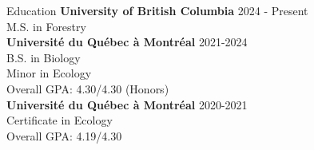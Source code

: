 \documentclass[
	11pt, %
]{resume} %
\begin{document}

\begin{rSection}{Education}
	\textbf{University of British Columbia} \hfill 2024 - Present\\
	M.S. in Forestry
	\smallskip \\
	\textbf{Université du Québec à Montréal} \hfill 2021-2024 \\ 
	B.S. in Biology\\ 
	Minor in Ecology \\ 
	Overall GPA: 4.30/4.30 (Honors)
	\smallskip \\
	\textbf{Université du Québec à Montréal} \hfill 2020-2021 \\ 
	Certificate in Ecology\\ 
	Overall GPA: 4.19/4.30
	
\end{rSection}
\end{document}
